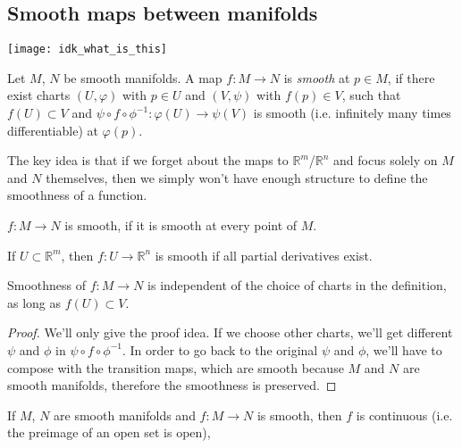 \pagebreak
\subsection{Smooth maps between manifolds}
\begin{figure*}[h]
    \centering
    \texttt{[image: idk\_what\_is\_this]}
\end{figure*}

\begin{definition}
    Let $M$, $N$ be smooth manifolds.
    A map $f : M \to N$ is \textit{smooth} at $p \in M$,
    if there exist charts $(U, \varphi)$ with $p \in U$ and
    $(V, \psi)$ with $f(p) \in V$, such that $f(U) \subset V$ and
    $\psi \circ f \circ \phi^{-1} : \varphi(U) \to \psi(V)$
    is smooth (i.e. infinitely many times differentiable) at $\varphi(p)$.
\end{definition}
\begin{remark}
    The key idea is that if we forget about the maps to $\mathbb{R}^m$/$\mathbb{R}^n$
    and focus solely on $M$ and $N$ themselves, then we simply won't have enough
    structure to define the smoothness of a function.
\end{remark}
\begin{definition}
    $f : M \to N$ is smooth, if it is smooth at every point of $M$.
\end{definition}
\begin{remark}
    If $U \subset \mathbb{R}^m$, then $f : U \to \mathbb{R}^n$
    is smooth if all partial derivatives exist.
\end{remark}
\begin{lemma}
    \label{lem:independentOfChartChoice}
    Smoothness of $f : M \to N$ is independent of the choice of 
    charts in the definition, as long as $f(U) \subset V$.
\end{lemma}
\begin{proof}
    We'll only give the proof idea.
    If we choose other charts, we'll get different $\psi$ and $\phi$ in 
    $\psi \circ f \circ \phi^{-1}$. In order to go back to the original
    $\psi$ and $\phi$, we'll have to compose with the transition maps,
    which are smooth because $M$ and $N$ are smooth manifolds,
    therefore the smoothness is preserved.
\end{proof}
\begin{proposition}
    If $M$, $N$ are smooth manifolds and
    $f : M \to N$ is smooth, then $f$ is continuous (i.e. the preimage of 
    an open set is open),
\end{proposition}
